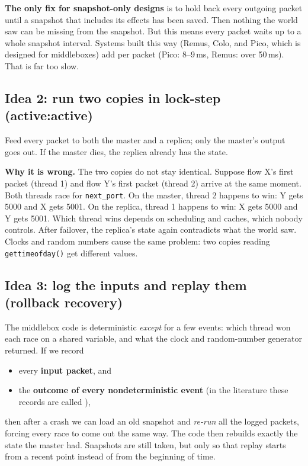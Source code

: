 \textbf{The only fix for snapshot-only designs} is to hold back every outgoing packet until a snapshot that includes its effects has
been saved. Then nothing the world saw can be missing from the snapshot. But this means every packet waits up to a whole snapshot
interval. Systems built this way (Remus, Colo, and Pico, which is designed for middleboxes) add  per packet
(Pico: 8--9\,ms, Remus: over 50\,ms). That is far too slow.

\subsection{Idea 2: run two copies in lock-step (active:active)}
Feed every packet to both the master and a replica; only the master's output goes out. If the master dies, the replica already
has the state.

\textbf{Why it is wrong.} The two copies do not stay identical. Suppose flow X's first packet (thread 1) and flow Y's first
packet (thread 2) arrive at the same moment. Both threads race for \texttt{next\_port}. On the master, thread 2 happens to win:
Y gets 5000 and X gets 5001. On the replica, thread 1 happens to win: X gets 5000 and Y gets 5001. Which thread wins depends on
scheduling and caches, which nobody controls. After failover, the replica's state again contradicts what the world saw.
Clocks and random numbers cause the same problem: two copies reading \texttt{gettimeofday()} get different values.

\subsection{Idea 3: log the inputs and replay them (rollback recovery)}
The middlebox code is deterministic \emph{except} for a few events: which thread won each race on a shared variable, and what the
clock and random-number generator returned. If we record
\begin{itemize}
  \item every \textbf{input packet}, and
  \item the \textbf{outcome of every nondeterministic event} (in the literature these records are called ),
\end{itemize}
then after a crash we can load an old snapshot and \emph{re-run} all the logged packets, forcing every race to come out the same way.
The code then rebuilds exactly the state the master had. Snapshots are still taken, but only so that replay starts from a recent
point instead of from the beginning of time.

